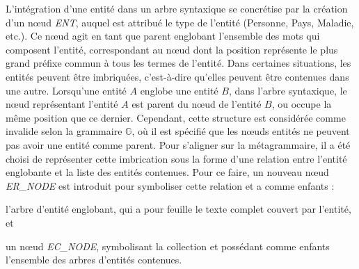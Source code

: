 L'intégration d'une entité dans un arbre syntaxique se concrétise par la création d'un nœud \emph{ENT}, auquel est attribué le type de l'entité (Personne, Pays, Maladie, etc.).
Ce nœud agit en tant que parent englobant l'ensemble des mots qui composent l'entité, correspondant au nœud dont la position représente le plus grand préfixe commun à tous les termes de l'entité.
Dans certaines situations, les entités peuvent être imbriquées, c'est-à-dire qu'elles peuvent être contenues dans une autre.
Lorsqu'une entité $A$ englobe une entité $B$, dans l'arbre syntaxique, le nœud représentant l'entité $A$ est parent du nœud de l'entité $B$, ou occupe la même position que ce dernier.
Cependant, cette structure est considérée comme invalide selon la grammaire $\mathbb{G}$, où il est spécifié que les nœuds entités ne peuvent pas avoir une entité comme parent.
Pour s'aligner sur la métagrammaire, il a été choisi de représenter cette imbrication sous la forme d'une relation entre l'entité englobante et la liste des entités contenues.
Pour ce faire, un nouveau nœud \emph{ER\_NODE} est introduit pour symboliser cette relation et a comme enfants :
\begin{enumerate*}[label=(\roman*)]
\item l'arbre d'entité englobant, qui a pour feuille le texte complet couvert par l'entité, et
\item un nœud \emph{EC\_NODE}, symbolisant la collection et possédant comme enfants l'ensemble des arbres d'entités contenues.
\end{enumerate*}

